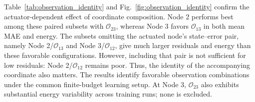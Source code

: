Table~\ref{tab:observation_identity} and Fig.~\ref{fig:observation_identity} confirm the actuator-dependent effect of coordinate composition. Node 2 performs best among these paired subsets with $\mathcal O_{23}$, whereas Node 3 favors $\mathcal O_{13}$ in both mean MAE and energy. The subsets omitting the actuated node's state--error pair, namely Node 2/$\mathcal O_{13}$ and Node 3/$\mathcal O_{12}$, give much larger residuals and energy than these favorable configurations. However, including that pair is not sufficient for low residuals: Node 2/$\mathcal O_{12}$ remains poor. Thus, the identity of the accompanying coordinate also matters. The results identify favorable observation combinations under the common finite-budget learning setup. At Node 3, $\mathcal O_{23}$ also exhibits substantial energy variability across training runs; none is excluded.
